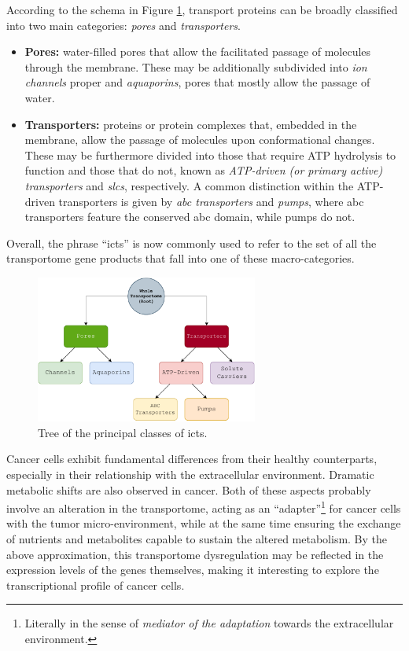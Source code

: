 According to the schema in Figure \ref{fig:BasicTree}, transport proteins can be broadly classified into two main categories: \textit{pores} and \textit{transporters}.
\begin{itemize}
    \item \textbf{Pores:} water-filled pores that allow the facilitated passage of molecules through the membrane.
    These may be additionally subdivided into \textit{ion channels} proper and \textit{aquaporins}, pores that mostly allow the passage of water.
    \item \textbf{Transporters:} proteins or protein complexes that, embedded in the membrane, allow the passage of molecules upon conformational changes.
    These may be furthermore divided into those that require ATP hydrolysis to function and those that do not, known as \textit{ATP-driven (or primary active) transporters} and \textit{\glspl{slc}}, respectively.
    A common distinction within the ATP-driven transporters is given by \textit{\gls{abc} transporters} and \textit{pumps}, where \gls{abc} transporters feature the conserved \gls{abc} domain, while pumps do not.
\end{itemize}
Overall, the phrase ``\glspl{ict}'' is now commonly used to refer to the set of all the transportome gene products that fall into one of these macro-categories.

\begin{figure}
    \centering
    \includegraphics[width=0.65\textwidth]{resources/images/BasicTree.pdf}
    \caption{\small Tree of the principal classes of \glspl{ict}.}
    \label{fig:BasicTree}
\end{figure}

Cancer cells exhibit fundamental differences from their healthy counterparts, especially in their relationship with the extracellular environment.
Dramatic metabolic shifts are also observed in cancer.
Both of these aspects probably involve an alteration in the transportome, acting as an ``adapter''\footnote{Literally in the sense of \textit{mediator of the adaptation} towards the extracellular environment.} for cancer cells with the tumor micro-environment, while at the same time ensuring the exchange of nutrients and metabolites capable to sustain the altered metabolism.
By the above approximation, this transportome dysregulation may be reflected in the expression levels of the genes themselves, making it interesting to explore the transcriptional profile of cancer cells.

